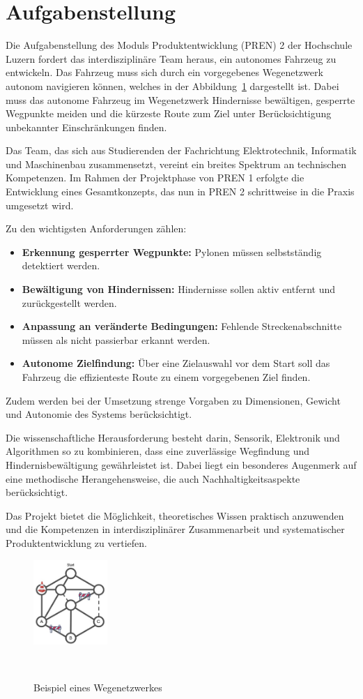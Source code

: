 \documentclass[main.tex]{subfiles} %
\begin{document}

\section{Aufgabenstellung}

Die Aufgabenstellung des Moduls Produktentwicklung (PREN) 2 der
Hochschule Luzern fordert das interdisziplinäre Team heraus, ein autonomes 
Fahrzeug zu entwickeln. Das Fahrzeug muss sich durch ein vorgegebenes Wegenetzwerk autonom navigieren können, welches in der Abbildung~\ref{fig:Wegenetzwerk_Aufgabenstellung} dargestellt ist.
Dabei muss das autonome Fahrzeug im Wegenetzwerk Hindernisse bewältigen, gesperrte Wegpunkte meiden und die kürzeste 
Route zum Ziel unter Berücksichtigung unbekannter Einschränkungen finden.

Das Team, das sich aus Studierenden der Fachrichtung Elektrotechnik, Informatik und Maschinenbau 
zusammensetzt, vereint ein breites Spektrum an technischen Kompetenzen. Im Rahmen der Projektphase von PREN 1 
erfolgte die Entwicklung eines Gesamtkonzepts, das nun in PREN 2 schrittweise in die Praxis umgesetzt wird.

Zu den wichtigsten Anforderungen zählen:
\begin{itemize}
    \item \textbf{Erkennung gesperrter Wegpunkte:} Pylonen müssen selbstständig detektiert werden.
    \item \textbf{Bewältigung von Hindernissen:} Hindernisse sollen aktiv entfernt und zurückgestellt werden.
    \item \textbf{Anpassung an veränderte Bedingungen:} Fehlende Streckenabschnitte müssen als nicht passierbar erkannt werden.
    \item \textbf{Autonome Zielfindung:} Über eine Zielauswahl vor dem Start soll das Fahrzeug die effizienteste Route zu einem vorgegebenen Ziel finden.
\end{itemize}

Zudem werden bei der Umsetzung strenge Vorgaben zu Dimensionen, Gewicht und
Autonomie des Systems berücksichtigt.

Die wissenschaftliche Herausforderung besteht darin, Sensorik, Elektronik 
und Algorithmen so zu kombinieren, dass eine zuverlässige Wegfindung und 
Hindernisbewältigung gewährleistet ist. Dabei liegt ein besonderes Augenmerk auf 
eine methodische Herangehensweise, die auch Nachhaltigkeitsaspekte berücksichtigt.

Das Projekt bietet die Möglichkeit, theoretisches Wissen praktisch 
anzuwenden und die Kompetenzen in interdisziplinärer Zusammenarbeit 
und systematischer Produktentwicklung zu vertiefen.

\begin{figure}[H]
    \centering
    \includegraphics[width=0.25\textwidth]{Wegenetzwerk_Aufgabenstellung.pdf}
    \caption{Beispiel eines Wegenetzwerkes}~\label{fig:Wegenetzwerk_Aufgabenstellung}
\end{figure}
\end{document}
